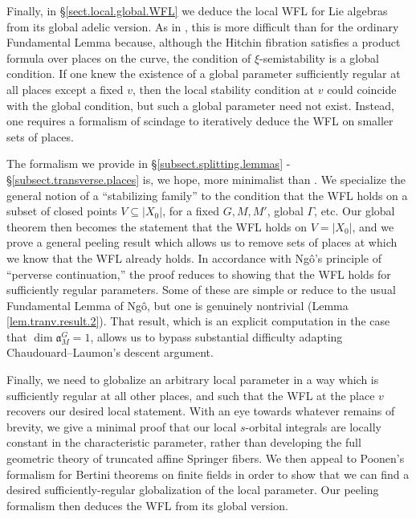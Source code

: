 \documentclass[openany]{amsbook}
\theoremstyle{definition}
\theoremstyle{remark}
\numberwithin{equation}{section}
\renewcommand{\-}{\operatorname{-}}
\renewcommand{\a}{\mathfrak{a}}
\begin{document}
Finally, in \S \ref{sect.local.global.WFL} we deduce the local WFL for Lie algebras from its global adelic version. As in \cite{CLII}, this is more difficult than for the ordinary Fundamental Lemma because, although the Hitchin fibration satisfies a product formula over places on the curve, the condition of $\xi$-semistability is a global condition. If one knew the existence of a global parameter sufficiently regular at all places except a fixed $v$, then the local stability condition at $v$ could coincide with the global condition, but such a global parameter need not exist. Instead, one requires a formalism of scindage to iteratively deduce the WFL on smaller sets of places. 

The formalism we provide in \S \ref{subsect.splitting.lemmas} - \S \ref{subsect.transverse.places} is, we hope, more minimalist than \cite[\S 16-18]{CLII}. We specialize the general notion of a ``stabilizing family'' to the condition that the WFL holds on a subset of closed points $V \subseteq |X_0|$, for a fixed $G,M, M'$, global $\Gamma$, etc. Our global theorem then becomes the statement that the WFL holds on $V = |X_0|$, and we prove a general peeling result which allows us to remove sets of places at which we know that the WFL already holds. In accordance with Ng\^{o}'s principle of ``perverse continuation,'' the proof reduces to showing that the WFL holds for sufficiently regular parameters. Some of these are simple or reduce to the usual Fundamental Lemma of Ng\^{o}, but one is genuinely nontrivial (Lemma \ref{lem.tranv.result.2}). That result, which is an explicit computation in the case that $\dim \a_M^G = 1$, allows us to bypass substantial difficulty adapting Chaudouard--Laumon's descent argument.

Finally, we need to globalize an arbitrary local parameter in a way which is sufficiently regular at all other places, and such that the WFL at the place $v$ recovers our desired local statement. With an eye towards whatever remains of brevity, we give a minimal proof that our local $s$-orbital integrals are locally constant in the characteristic parameter, rather than developing the full geometric theory of truncated affine Springer fibers. We then appeal to Poonen's formalism for Bertini theorems on finite fields \cite{poonenbertini} in order to show that we can find a desired sufficiently-regular globalization of the local parameter. Our peeling formalism then deduces the WFL from its global version.
\end{document}
